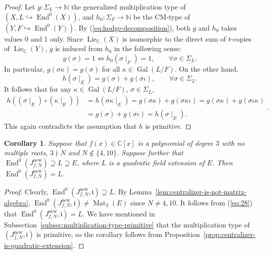 \documentclass{amsart}[11pt]
\newtheorem{cor}[thm]{Corollary}
\theoremstyle{definition}
\numberwithin{equation}{section}
\theoremstyle{notitle}
\begin{document}
\begin{proof}
    Let $g: \Sigma_L\to {\mathbb{N}}$ the generalized multiplication type of
    $(X, L\hookrightarrow \operatorname{End}^0(X))$, and $h_0: \Sigma_F\to {\mathbb{N}}$ be
    the CM-type of $(Y, F\hookrightarrow \operatorname{End}^0(Y))$. By
    (\ref{eq:hodge-decomposition}), both $g$ and $h_0$ takes values
    $0$ and $1$ only. Since $\operatorname{Lie}_{\mathbb{C}}(X)$ is isomorphic to the direct
    sum of $t$-copies of $\operatorname{Lie}_{\mathbb{C}}(Y)$, $g$ is induced from $h_0$ in
    the following sense:
    \[ g(\sigma)=1 \Leftrightarrow h_0(\sigma\mid_F)= 1, \qquad
    \forall \sigma\in \Sigma_L.\] In particular, $g(\sigma \kappa)=
    g(\sigma)$ for all $\kappa \in \operatorname{Gal}(L/F)$. On the other hand,
\[ h(\sigma\mid_E)= g(\sigma)+ g(\sigma\iota), \qquad \forall
\sigma\in \Sigma_L.\] 
It follows that for any $\kappa \in \operatorname{Gal}(L/F)$, $\sigma\in \Sigma_L$,  
\[
\begin{split}
h((\sigma\mid_E) \circ (\kappa\mid_E))&= h(\sigma\kappa \mid_E)=
g(\sigma\kappa)+ g(\sigma\kappa \iota)= g(\sigma\kappa)+g(\sigma \iota
\kappa)\\&= g(\sigma)+g(\sigma\iota)= h(\sigma\mid_E).
\end{split}.\]
This again contradicts the assumption that $h$ is primitive. 
\end{proof}

\begin{cor}\label{cor:nw-factor-of-jacobian-quad-ext}
  Suppose that $f(x)\in {\mathbb{C}}[x]$ is a polynomial of degree $3$ with no
  multiple roots, $3\nmid N$ and $N\not\in \{4, 10\}$.  Suppose
  further that $\operatorname{End}^0(J_{f,N}^{\mathrm{new}})\supseteq L \supseteq E$, where $L$
  is a quadratic field extension of $E$. Then $\operatorname{End}^0(J_{f,N}^{\mathrm{new}})=L$.
\end{cor}
\begin{proof}
  Clearly, $\operatorname{End}^0(J_{f,N}^{\mathrm{new}}, {\mathfrak{i}}) \supseteq L$. By
  Lemma~\ref{lem:centralizer-is-not-matrix-algebra},
  $\operatorname{End}^0(J_{f,N}^{\mathrm{new}}, {\mathfrak{i}})\neq \operatorname{Mat}_2(E)$ since $N\neq 4, 10$. It
  follows from (\ref{eq:28}) that $\operatorname{End}^0(J_{f,N}^{\mathrm{new}}, {\mathfrak{i}})= L$. We
  have mentioned in Subsection~\ref{subsec:multiplication-type-primitive}
  that the multiplication type of $(J_{f,N}^{\mathrm{new}}, {\mathfrak{i}})$ is primitive,
  so the corollary follows from
  Proposition~\ref{prop:centralizer-is-quadratic-extension}.
\end{proof}
\end{document}
